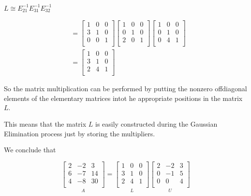 $L \cong E_{21}^{-1}E_{31}^{-1}E_{32}^{-1}$

\begin{align*}
  &= \begin{bmatrix}
  1 & 0 & 0\\
  3 & 1 & 0\\
  0 & 0 & 1\\
  \end{bmatrix} \begin{bmatrix}
  1 & 0 & 0\\
  0 & 1 & 0\\
  2 & 0 & 1\\
  \end{bmatrix} \begin{bmatrix}
  1 & 0 & 0\\
  0 & 1 & 0\\
  0 & 4 & 1\\
  \end{bmatrix} \\
  &= \begin{bmatrix}
  1 & 0 & 0\\
  3 & 1 & 0\\
  2 & 4 & 1\\
  \end{bmatrix}
\end{align*}

So the matrix multiplication can be performed by putting the nonzero offdiagonal
elements of the elementary matrices intot he appropriate positions in the matrix
$L$.

This means that the matrix $L$ is easily constructed during the Gaussian
Elimination process just by storing the multipliers.

We conclude that

\begin{equation*}
  \underset{A}{
    \begin{bmatrix}
      2 & -2 & 3\\
      6 & -7 & 14\\
      4 & -8 & 30\\
    \end{bmatrix}
  }
  =
  \underset{L}{
    \begin{bmatrix}
      1 & 0 & 0\\
      3 & 1 & 0\\
      2 & 4 & 1\\
    \end{bmatrix}
  }
  \underset{U}{
    \begin{bmatrix}
      2 & -2 & 3\\
      0 & -1 & 5\\
      0 & 0 & 4\\
    \end{bmatrix}
  }
\end{equation*}

